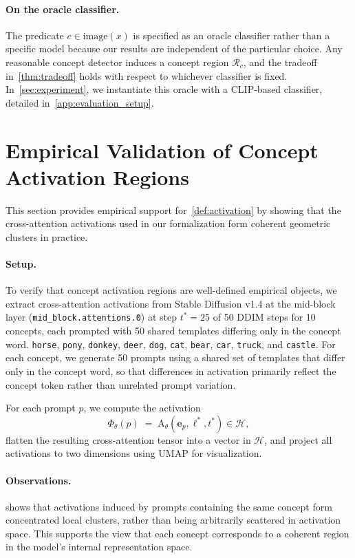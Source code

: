 \paragraph{On the oracle classifier.}
The predicate $c \in \text{image}(x)$ is specified as an oracle classifier rather than a specific model because our results are independent of the particular choice. Any reasonable concept detector induces a concept region $\mathcal{R}_c$, and the tradeoff in~\cref{thm:tradeoff} holds with respect to whichever classifier is fixed. In~\cref{sec:experiment}, we instantiate this oracle with a CLIP-based classifier, detailed in~\cref{app:evaluation_setup}. 
\section{Empirical Validation of Concept Activation Regions}
\label{app:activation_regions}
This section provides empirical support for~\cref{def:activation} by showing that the cross-attention activations used in our formalization form coherent geometric clusters in practice.
\paragraph{Setup.}
To verify that concept activation regions are well-defined empirical objects, we extract cross-attention activations from Stable Diffusion v1.4 at the mid-block layer (\texttt{mid\_block.attentions.0}) at step $t^*{=}25$ of 50 DDIM steps for 10 concepts, each prompted with 50 shared templates differing only in the concept word.
\texttt{horse}, \texttt{pony}, \texttt{donkey}, \texttt{deer}, \texttt{dog}, \texttt{cat}, \texttt{bear}, \texttt{car}, \texttt{truck}, and \texttt{castle}.
For each concept, we generate 50 prompts using a shared set of templates that differ only in the concept word, so that differences in activation primarily reflect the concept token rather than unrelated prompt variation.

For each prompt $p$, we compute the activation
\begin{equation}
    \Phi_{\theta}(p) \;=\; \mathrm{A}_{\theta}(\mathbf{e}_p,\ell^*,t^*) \in \mathcal{H},
\end{equation}
flatten the resulting cross-attention tensor into a vector in $\mathcal{H}$, and project all activations to two dimensions using UMAP for visualization.

\paragraph{Observations.}
 shows that activations induced by prompts containing the same concept form concentrated local clusters, rather than being arbitrarily scattered in activation space. This supports the view that each concept corresponds to a coherent region in the model's internal representation space.

